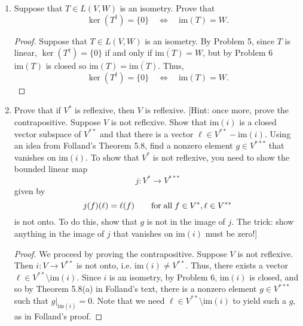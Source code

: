 \documentclass[11pt,oneside,english]{amsart}
\theoremstyle{definition}
\newcommand{\ve}{\varepsilon}
\begin{document}
\begin{enumerate}
\begin{proof}
\begin{align*}
\|T^{-1}(w_i)-T^{-1}(w_j)\|&=\|T^{-1}(w_i-w_j)\|\\[2mm]
&=\|w_i-w_j\|\\[2mm]
&=\|w_i-w+w_j-w\|\\[2mm]
&\leq\|w_i-w\|+\|w_j-w\|\\[2mm]
&<\frac{\ve}{2}+\frac{\ve}{2}\\[2mm]
&=\ve.
\end{align*}

Thus $\{T^{-1}(w_i)\}$ is a Cauchy sequence, and so it converges to some $v\in V$, i.e. $T^{-1}(w_i)\to v$. Then $w_i=T(T^{-1}(w_i))\to Tv$, and since it is known that $w_i\to w$, we have that $Tv=w$, and so $w\in\text{im}(T)$. Thus, $\text{im}(T)$ is closed.
\end{proof}

\item Suppose that $T \in L(V,W)$ is an isometry.  Prove that
\[     \ker(T^\dagger) = \{0\}  \quad \iff \quad \text{im}(T) = W  .\]

\begin{proof}
Suppose that $T \in L(V,W)$ is an isometry. By Problem 5, since $T$ is linear, $\ker(T^\dagger)=\{0\}$ if and only if $\overline{\text{im}(T)}=W$, but by Problem 6 $\text{im}(T)$ is closed so $\text{im}(T)=\overline{\text{im}(T)}$. Thus,
\[     \ker(T^\dagger) = \{0\}  \quad \iff \quad \text{im}(T) = W  .\]
\end{proof}

\item  Prove that if $V^*$ is reflexive, then $V$ is reflexive. [Hint: once more, prove the contrapositive. Suppose $V$ is not reflexive.  Show that $\text{im}(i)$ is a closed vector subspace of $V^{**}$ and that there is a vector $\ell \in V^{**} - \text{im}(i)$.  Using an idea from Folland's Theorem 5.8, find a nonzero element $g \in V^{***}$ that vanishes on $\text{im}(i)$.  To show that $V^*$ is not reflexive, you need to show the bounded linear map
\[                 j : V^* \to V^{***}   \]
given by
\[                 j(f)(\ell) = \ell(f) \qquad {\rm for \; all \; }  f \in V^*, \ell \in V^{**}\]
is not onto.   To do this, show that $g$ is not in the image of $j$.  The trick: show anything in the image of $j$ that vanishes on $\text{im}(i)$ must be zero!]

\begin{proof}
We proceed by proving the contrapositive. Suppose $V$ is not reflexive. Then $i:V\to V^{**}$ is not onto, i.e. $\text{im}(i)\neq V^{**}$. Thus, there exists a vector $\ell\in V^{**}\setminus\text{im}(i)$. Since $i$ is an isometry, by Problem 6, $\text{im}(i)$ is closed, and so by Theorem 5.8(a) in Folland's text, there is a nonzero element $g\in V^{***}$ such that $g\big|_{\text{im}(i)}=0$. Note that we need $\ell\in V^{**}\setminus\text{im}(i)$ to yield such a $g$, as in Folland's proof.


\end{proof}
\end{enumerate}
\end{document}
